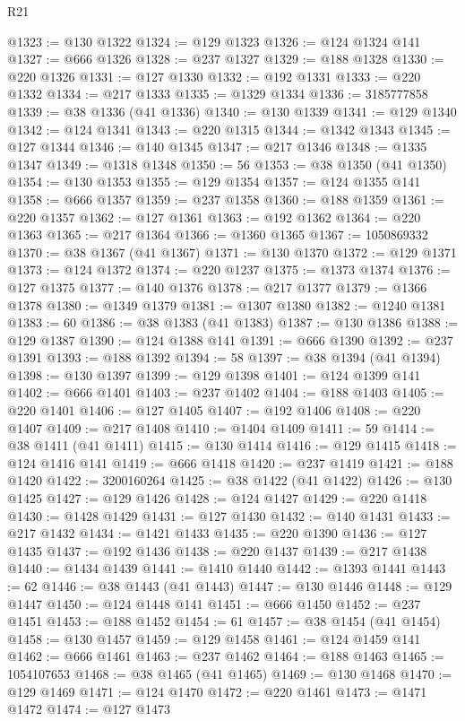 \begin{lexlean}{R21}
\begin{coremodule}
@1323 := @130 @1322
@1324 := @129 @1323
@1326 := @124 @1324 @141
@1327 := @666 @1326
@1328 := @237 @1327
@1329 := @188 @1328
@1330 := @220 @1326
@1331 := @127 @1330
@1332 := @192 @1331
@1333 := @220 @1332
@1334 := @217 @1333
@1335 := @1329 @1334
@1336 := 3185777858
@1339 := @38 @1336 (@41 @1336)
@1340 := @130 @1339
@1341 := @129 @1340
@1342 := @124 @1341
@1343 := @220 @1315
@1344 := @1342 @1343
@1345 := @127 @1344
@1346 := @140 @1345
@1347 := @217 @1346
@1348 := @1335 @1347
@1349 := @1318 @1348
@1350 := 56
@1353 := @38 @1350 (@41 @1350)
@1354 := @130 @1353
@1355 := @129 @1354
@1357 := @124 @1355 @141
@1358 := @666 @1357
@1359 := @237 @1358
@1360 := @188 @1359
@1361 := @220 @1357
@1362 := @127 @1361
@1363 := @192 @1362
@1364 := @220 @1363
@1365 := @217 @1364
@1366 := @1360 @1365
@1367 := 1050869332
@1370 := @38 @1367 (@41 @1367)
@1371 := @130 @1370
@1372 := @129 @1371
@1373 := @124 @1372
@1374 := @220 @1237
@1375 := @1373 @1374
@1376 := @127 @1375
@1377 := @140 @1376
@1378 := @217 @1377
@1379 := @1366 @1378
@1380 := @1349 @1379
@1381 := @1307 @1380
@1382 := @1240 @1381
@1383 := 60
@1386 := @38 @1383 (@41 @1383)
@1387 := @130 @1386
@1388 := @129 @1387
@1390 := @124 @1388 @141
@1391 := @666 @1390
@1392 := @237 @1391
@1393 := @188 @1392
@1394 := 58
@1397 := @38 @1394 (@41 @1394)
@1398 := @130 @1397
@1399 := @129 @1398
@1401 := @124 @1399 @141
@1402 := @666 @1401
@1403 := @237 @1402
@1404 := @188 @1403
@1405 := @220 @1401
@1406 := @127 @1405
@1407 := @192 @1406
@1408 := @220 @1407
@1409 := @217 @1408
@1410 := @1404 @1409
@1411 := 59
@1414 := @38 @1411 (@41 @1411)
@1415 := @130 @1414
@1416 := @129 @1415
@1418 := @124 @1416 @141
@1419 := @666 @1418
@1420 := @237 @1419
@1421 := @188 @1420
@1422 := 3200160264
@1425 := @38 @1422 (@41 @1422)
@1426 := @130 @1425
@1427 := @129 @1426
@1428 := @124 @1427
@1429 := @220 @1418
@1430 := @1428 @1429
@1431 := @127 @1430
@1432 := @140 @1431
@1433 := @217 @1432
@1434 := @1421 @1433
@1435 := @220 @1390
@1436 := @127 @1435
@1437 := @192 @1436
@1438 := @220 @1437
@1439 := @217 @1438
@1440 := @1434 @1439
@1441 := @1410 @1440
@1442 := @1393 @1441
@1443 := 62
@1446 := @38 @1443 (@41 @1443)
@1447 := @130 @1446
@1448 := @129 @1447
@1450 := @124 @1448 @141
@1451 := @666 @1450
@1452 := @237 @1451
@1453 := @188 @1452
@1454 := 61
@1457 := @38 @1454 (@41 @1454)
@1458 := @130 @1457
@1459 := @129 @1458
@1461 := @124 @1459 @141
@1462 := @666 @1461
@1463 := @237 @1462
@1464 := @188 @1463
@1465 := 1054107653
@1468 := @38 @1465 (@41 @1465)
@1469 := @130 @1468
@1470 := @129 @1469
@1471 := @124 @1470
@1472 := @220 @1461
@1473 := @1471 @1472
@1474 := @127 @1473

\end{coremodule}
\end{lexlean}
